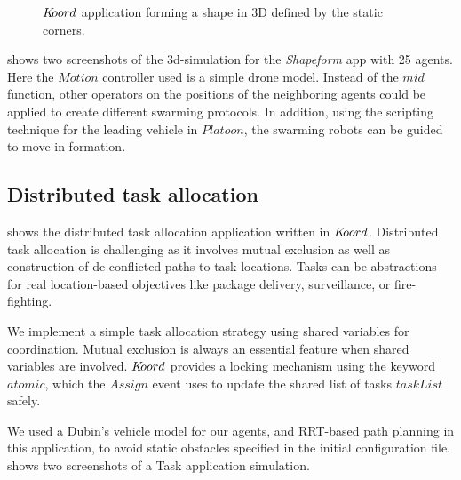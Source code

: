 \begin{figure}[ht!]
\begin{mdframed}
    \noindent
    \begin{center}
        \scriptsize
          {}
{}
    \end{center}
\end{mdframed}
    \caption{$K\kern-2pt oord$ application forming a shape in 3D defined by the static corners.}
    \label{fig:squareform}
\end{figure}

 shows two screenshots of the 3d-simulation for the \emph{Shapeform} app with 25 agents. Here the $\mathit{Motion}$ controller used is a simple drone model. Instead of the $\mathit{mid}$ function, other operators on the positions of the neighboring agents could be applied to create different swarming protocols. In addition, using the scripting technique for the leading vehicle in $\mathit{Platoon}$, the swarming robots can be guided to move in formation.


\subsection{Distributed task allocation}
\label{sec:task}
  shows the distributed task allocation application written in $K\kern-2pt oord$. Distributed task allocation is challenging as it involves mutual exclusion as well as construction of de-conflicted paths to task locations. Tasks can be abstractions for real location-based objectives like package delivery, surveillance, or fire-fighting. 

We implement a simple task allocation strategy using shared variables for coordination. Mutual exclusion is always an essential feature when shared variables are involved. $K\kern-2pt oord$ provides a locking mechanism using the keyword $\mathit{atomic}$, which the $\mathit{Assign}$ event uses to update the shared list of tasks $\mathit{taskList}$ safely. 

We used a Dubin's vehicle model for our agents, and RRT-based path planning in this application, to avoid static obstacles specified in the initial configuration file.  shows two screenshots of a Task application simulation. 

